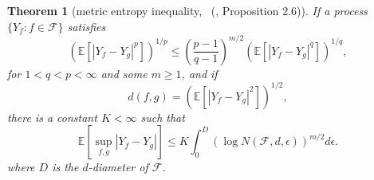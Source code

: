 \documentclass[letterpaper]{article} %
\newtheorem{theorem}{Theorem}
\newcommand{\E}{\mathbb{E}}
\newcommand{\citett}[2]{\citeauthor{#2}\ (\citeyear{#2}, #1)}
\begin{document}
\begin{theorem}[metric entropy inequality, {\citett{Proposition 2.6}{Dembo1994}}]
    \label{th:rademacher_process_chaining}
    If a process $\{Y_f: f\in\mathcal F\}$ satisfies
\begin{equation}
    \label{eq:kinchine_type_inequality_process}
    (\E[|Y_f-Y_g|^p])^{1/p}\le (\frac{p-1}{q-1})^{m/2}(\E[|Y_f-Y_g|^q])^{1/q},
\end{equation}
for $1<q<p<\infty$ and some $m\ge 1$, and if
\begin{equation}
    \label{eq:process_distance}
    d(f,g) = (\E[|Y_f-Y_g|^2])^{1/2},
\end{equation}
there is a constant $K<\infty$ such that
    \begin{equation}
        \label{eq:rademacher_process_chaining}
        \E[\sup_{f,g}|Y_f-Y_g|]\le K\int_0^D(\log N(\mathcal F,d,\epsilon))^{m/2}d\epsilon.
    \end{equation}
    where $D$ is the $d$-diameter of $\mathcal{F}$.
\end{theorem}
\end{document}
